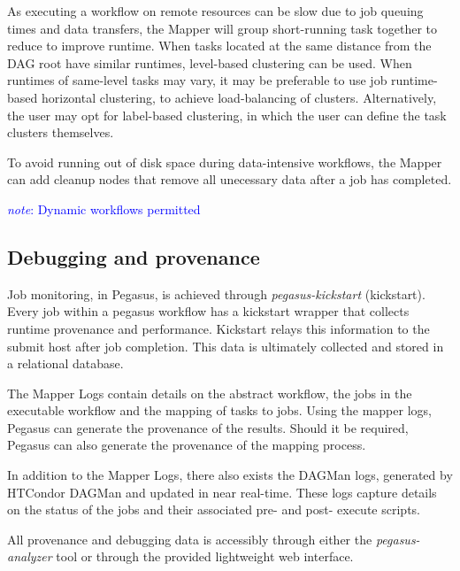 \documentclass{report}
\newcommand{\note}[1]{\textcolor{blue}{\textit{note}: #1}}
\begin{document}
        As executing a workflow on remote resources can be slow due to job
        queuing times and data transfers, the Mapper will group short-running
        task together to reduce to improve runtime.  When tasks located at the
        same distance from the DAG root have similar runtimes, level-based
        clustering can be used. When runtimes of same-level tasks may vary, it
        may be preferable to use job runtime-based horizontal clustering, to
        achieve load-balancing of clusters. Alternatively, the user may opt for
        label-based clustering, in which the user can define the task clusters
        themselves.

        To avoid running out of disk space during data-intensive workflows, the
        Mapper can add cleanup nodes that remove all unecessary data after a job
        has completed.
 
        \note{Dynamic workflows permitted}

        \subsection{Debugging and provenance} Job monitoring, in Pegasus, is
        achieved through \textit{pegasus-kickstart} (kickstart). Every job
        within a pegasus workflow has a kickstart wrapper that collects runtime
        provenance and performance. Kickstart relays this information to the
        submit host after job completion. This data is ultimately collected and
        stored in a relational database.

        The Mapper Logs contain details on the abstract workflow, the jobs in
        the executable workflow and the mapping of tasks to jobs. Using the
        mapper logs, Pegasus can generate the provenance of the results. Should
        it be required, Pegasus can also generate the provenance of the mapping
        process.

        In addition to the Mapper Logs, there also exists the DAGMan logs,
        generated by HTCondor DAGMan and updated in near real-time. These logs
        capture details on the status of the jobs and their associated pre- and
        post- execute scripts.

        All provenance and debugging data is accessibly through either the
        \textit{pegasus-analyzer} tool or through the provided lightweight web
        interface.  
         
\end{document}

